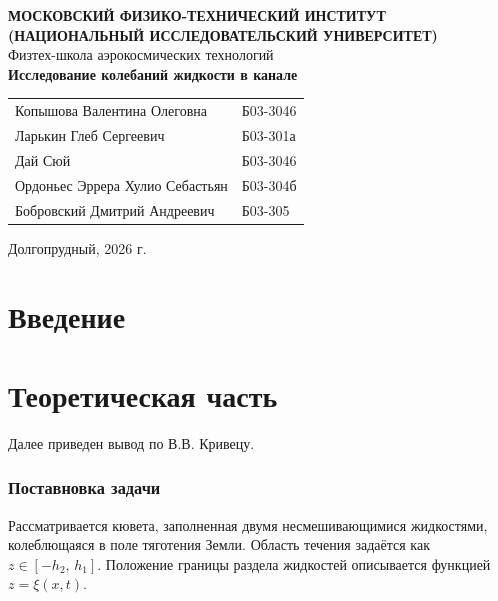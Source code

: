 \documentclass[a4paper,12pt]{article}
\begin{document}
\begin{titlepage}
    \begin{center}
        \textbf{МОСКОВСКИЙ ФИЗИКО-ТЕХНИЧЕСКИЙ ИНСТИТУТ} \\
        \textbf{(НАЦИОНАЛЬНЫЙ ИССЛЕДОВАТЕЛЬСКИЙ УНИВЕРСИТЕТ)}
        \\[1cm]

        
        {\large Физтех-школа аэрокосмических технологий}
        \\[3.5cm]

        {\Huge \textbf{Исследование колебаний жидкости в канале}}
        \\[0.5cm]

        \begin{flushright}
            \begin{tabular}{l l}
                Копышова Валентина Олеговна & Б03-3046 \\
                Ларькин Глеб Сергеевич & Б03-301а \\
                Дай Сюй                  & Б03-3046 \\
                Ордоньес Эррера Хулио Себастьян & Б03-304б \\
                Бобровский Дмитрий Андреевич & Б03-305 \\
            \end{tabular}
        \end{flushright}

        \vfill

        {\large Долгопрудный, 2026 г.}
    \end{center}
\end{titlepage}

\tableofcontents
\newpage

\section{Введение}

\section{Теоретическая часть}
Далее приведен вывод по В.В. Кривецу.

\subsubsection*{Поставновка задачи}
Рассматривается кювета, заполненная двумя несмешивающимися жидкостями,
колеблющаяся в поле тяготения Земли. Область течения задаётся как
$z \in [-h_2,\, h_1]$. Положение границы раздела жидкостей описывается
функцией $z = \xi(x, t)$.
\end{document}
